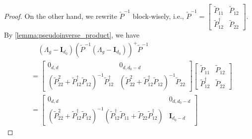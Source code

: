 \documentclass{article}
\theoremstyle{plain}
\theoremstyle{definition}
\theoremstyle{remark}
\theoremstyle{remark}
\begin{document}
\begin{proof}
    On the other hand, we rewrite $\widetilde{P}^{-1}$ block-wisely, i.e., $\widetilde{P}^{-1} = \begin{bmatrix} \widetilde{P}_{11} & \widetilde{P}_{12} \\ \widetilde{P}_{12}^{\dagger} & \widetilde{P}_{22} \end{bmatrix}$. By \autoref{lemma:pseudoinverse_product}, we have
    \begin{align}
      &\quad (\Lambda_g - \mathbf{I}_{d_0}) \left(\widetilde{P}^{-1} (\Lambda_g - \mathbf{I}_{d_0}) \right)^{+} \widetilde{P}^{-1} \\
      &= \begin{bmatrix} 
        0_{d, d} & 0_{d, d_0-d} \\ 
        (\widetilde{P}_{22}^2 + \widetilde{P}_{12}^{\dagger} \widetilde{P}_{12})^{-1} \widetilde{P}_{12}^{\dagger} & (\widetilde{P}_{22}^2 + \widetilde{P}_{12}^{\dagger} \widetilde{P}_{12})^{-1} \widetilde{P}_{22} 
      \end{bmatrix} 
      \begin{bmatrix} 
        \widetilde{P}_{11} & \widetilde{P}_{12} \\ 
        \widetilde{P}_{12}^{\dagger} & \widetilde{P}_{22} 
      \end{bmatrix} \nonumber \\ 
      &=\begin{bmatrix} 
        0_{d, d} & 0_{d, d_0-d} \\ 
        (\widetilde{P}_{22}^2 + \widetilde{P}_{12}^{\dagger} \widetilde{P}_{12})^{-1}(\widetilde{P}_{12}^{\dagger}\widetilde{P}_{11}+\widetilde{P}_{22} \widetilde{P}_{12}^{\dagger}) & \mathbf{I}_{d_0-d}
        \end{bmatrix}  
    \end{align}


\end{proof}
\end{document}
